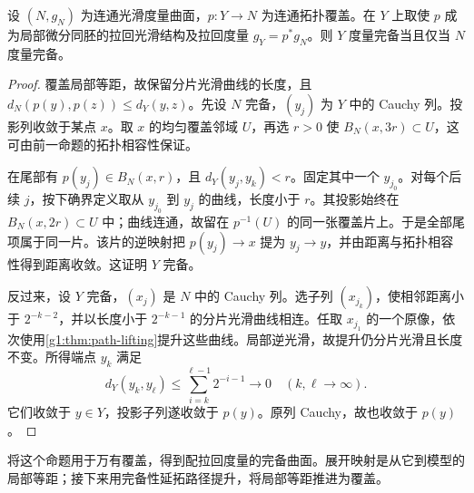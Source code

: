 \begin{proposition}
	\label{g1:prop:complete-pullback-cover}
	设 \((N,g_N)\) 为连通光滑度量曲面，\(p:Y\to N\) 为连通拓扑覆盖。在 \(Y\) 上取使 \(p\) 成为局部微分同胚的拉回光滑结构及拉回度量 \(g_Y=p^*g_N\)。则 \(Y\) 度量完备当且仅当 \(N\) 度量完备。
\end{proposition}
\begin{proof}
	覆盖局部等距，故保留分片光滑曲线的长度，且 \(d_N(p(y),p(z))\le d_Y(y,z)\)。先设 \(N\) 完备，\((y_j)\) 为 \(Y\) 中的 Cauchy 列。投影列收敛于某点 \(x\)。取 \(x\) 的均匀覆盖邻域 \(U\)，再选 \(r>0\) 使 \(B_N(x,3r)\subset U\)，这可由前一命题的拓扑相容性保证。

	在尾部有 \(p(y_j)\in B_N(x,r)\)，且 \(d_Y(y_j,y_k)<r\)。固定其中一个 \(y_{j_0}\)。对每个后续 \(j\)，按下确界定义取从 \(y_{j_0}\) 到 \(y_j\) 的曲线，长度小于 \(r\)。其投影始终在 \(B_N(x,2r)\subset U\) 中；曲线连通，故留在 \(p^{-1}(U)\) 的同一张覆盖片上。于是全部尾项属于同一片。该片的逆映射把 \(p(y_j)\to x\) 提为 \(y_j\to y\)，并由距离与拓扑相容性得到距离收敛。这证明 \(Y\) 完备。

	反过来，设 \(Y\) 完备，\((x_j)\) 是 \(N\) 中的 Cauchy 列。选子列 \((x_{j_k})\)，使相邻距离小于 \(2^{-k-2}\)，并以长度小于 \(2^{-k-1}\) 的分片光滑曲线相连。任取 \(x_{j_1}\) 的一个原像，依次使用\cref{g1:thm:path-lifting}提升这些曲线。局部逆光滑，故提升仍分片光滑且长度不变。所得端点 \(y_k\) 满足
	\[
		d_Y(y_k,y_\ell)\le\sum_{i=k}^{\ell-1}2^{-i-1}\longrightarrow0
		\quad(k,\ell\to\infty).
	\]
	它们收敛于 \(y\in Y\)，投影子列遂收敛于 \(p(y)\)。原列 Cauchy，故也收敛于 \(p(y)\)。
\end{proof}

将这个命题用于万有覆盖，得到配拉回度量的完备曲面。展开映射是从它到模型的局部等距；接下来用完备性延拓路径提升，将局部等距推进为覆盖。

